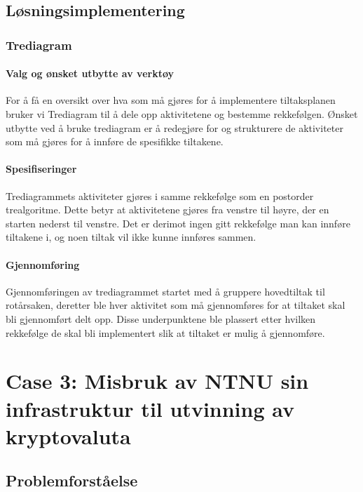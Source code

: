 \subsection{Løsningsimplementering}

\subsubsection{Trediagram}

\paragraph{Valg og ønsket utbytte av verktøy}
For å få en oversikt over hva som må gjøres for å implementere tiltaksplanen bruker vi Trediagram til å dele opp aktivitetene og bestemme rekkefølgen. Ønsket utbytte ved å bruke trediagram er å redegjøre for og strukturere de aktiviteter som må gjøres for å innføre de spesifikke tiltakene. 

\paragraph{Spesifiseringer}
Trediagrammets aktiviteter gjøres i samme rekkefølge som en postorder trealgoritme. Dette betyr at aktivitetene gjøres fra venstre til høyre, der en starten nederst til venstre. Det er derimot ingen gitt rekkefølge man kan innføre tiltakene i, og noen tiltak vil ikke kunne innføres sammen. 

\paragraph{Gjennomføring}
Gjennomføringen av trediagrammet startet med å gruppere hovedtiltak til rotårsaken, deretter ble hver aktivitet som må gjennomføres for at tiltaket skal bli gjennomført delt opp. Disse underpunktene ble plassert etter hvilken rekkefølge de skal bli implementert slik at tiltaket er mulig å gjennomføre. 


\newpage
\section{Case 3: Misbruk av NTNU sin infrastruktur til utvinning av kryptovaluta}

\subsection{Problemforståelse}
